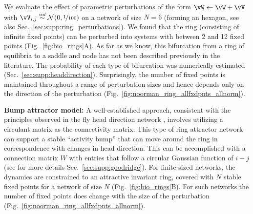 \documentclass{article} %
\newcommand{\ptitle}[1]{\textbf{#1:}\xspace}
\newcounter{ct}
\newcommand{\iidsample}{\stackrel{iid}{\sim}}
\theoremstyle{definition}
\theoremstyle{remark}
\begin{document}
We evaluate the effect of parametric perturbations of the form \( \vW \leftarrow \vW + \vV\) with \(\vV_{i, j}\iidsample\mathcal{N}(0,\nicefrac{1}{100})\) on a network of size \(N = 6\) (forming an hexagon, see also Sec.~\ref{sec:supp:ring_perturbations}). %
We found that the ring (consisting of infinite fixed points) can be perturbed into systems with between 2 and 12 fixed points (Fig.~\ref{fig:bio_rings}A).
As far as we know, this bifurcation from a ring of equilibria to a saddle and node has not been described previously in the literature.
The probability of each type of bifurcation was numerically estimated (Sec.~\ref{sec:supp:headdirection}).
Surprisingly, the number of fixed points is maintained throughout a range of perturbation sizes and hence depends only on the direction of the perturbation (Fig.~\ref{fig:noorman_ring_allfxdpnts_allnorm}).


\ptitle{Bump attractor model}
A well-established approach, consistent with the principles observed in the fly head direction network \citep{kakaria2017}, involves utilizing a circulant matrix as the connectivity matrix\citep{benyishai1995theory,samsonovich1997path}.
This type of ring attractor network can support a stable ``activity bump'' that can move around the ring in correspondence with changes in head direction.
This can be accomplished with a connection matrix \(W\) with entries that follow a circular Gaussian function of \(i - j\) \citep{seeholzer2017efficient,redish1996coupled,goodridge2000,compte2000synaptic} (see for more details Sec.~\ref{sec:supp:goodridge}).
For finite-sized networks, the dynamics are constrained to an attractive invariant ring, covered with \(N\) stable fixed points for a network of size \(N\) (Fig.~\ref{fig:bio_rings}B).
For such networks the number of fixed points does change with the size of the perturbation (Fig.~\ref{fig:noorman_ring_allfxdpnts_allnorm}).
\end{document}
